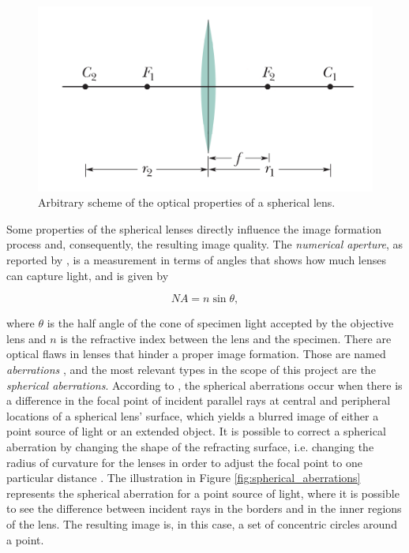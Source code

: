\begin{figure}[htb]
	\centering
	\caption{\label{fig:spherical_lens} Arbitrary scheme of the optical properties of a spherical lens.}
	\begin{center}
	    \includegraphics[scale=0.4]{images/fig4.png}
	\end{center}
	\centering
\end{figure}

Some properties of the spherical lenses directly influence the image formation process and, consequently, the resulting image quality. The \emph{numerical aperture}, as reported by , is a measurement in terms of angles that shows how much lenses can capture light, and is given by

\begin{equation}
    \label{eqn:numerical_aperture}
    NA = n \sin{\theta},
\end{equation}

\noindent where $\theta$ is the half angle of the cone of specimen light accepted by the objective lens and $n$ is the refractive index between the lens and the specimen. There are optical flaws in lenses that hinder a proper image formation. Those are named \emph{aberrations} \cite{lawlor2019introduction}, and the most relevant types in the scope of this project are the \emph{spherical aberrations}. According to , the spherical aberrations occur when there is a difference in the focal point of incident parallel rays at central and peripheral locations of a spherical lens' surface, which yields a blurred image of either a point source of light or an extended object. It is possible to correct a spherical aberration by changing the shape of the refracting surface, i.e. changing the radius of curvature for the lenses in order to adjust the focal point to one particular distance \cite{smith1988optics}. The illustration in Figure \ref{fig:spherical_aberrations} represents the spherical aberration for a point source of light, where it is possible to see the difference between incident rays in the borders and in the inner regions of the lens. The resulting image is, in this case, a set of concentric circles around a point.

